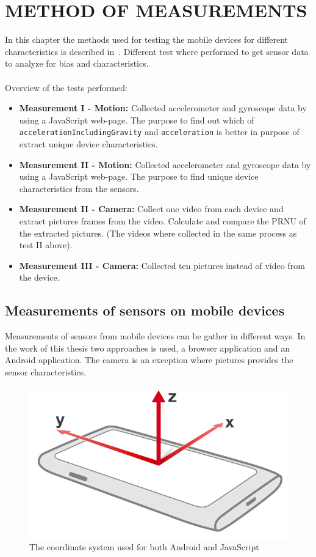 \chapter{METHOD OF MEASUREMENTS}\label{cha:measurements}
In this chapter the methods used for testing the mobile devices for different characteristics is described in~. Different test where performed to get sensor data to analyze for bias and characteristics. \\
\\
Overview of the tests performed:
\begin{itemize}
  \item[] \textbf{Measurement I - Motion:} Collected accelerometer and gyroscope data by using a JavaScript web-page. The purpose to find out which of \texttt{accelerationIncludingGravity} and \texttt{acceleration} is better in purpose of extract unique device characteristics.
  \item[] \textbf{Measurement II - Motion:} Collected accelerometer and gyroscope data by using a JavaScript web-page. The purpose to find unique device characteristics from the sensors. 
  \item[] \textbf{Measurement II - Camera:} Collect one video from each device and extract pictures frames from the video. Calculate and compare the PRNU of the extracted pictures. (The videos where collected in the same process as test II above).
  \item[] \textbf{Measurement III - Camera:} Collected ten pictures instead of video from the device. 
\end{itemize}

\section{Measurements of sensors on mobile devices}\label{sec:charMeasureSensor}
Measurements of sensors from mobile devices can be gather in different ways. In the work of this thesis two approaches is used, a browser application and an Android application. The camera is an exception where pictures provides the sensor characteristics.
\begin{figure}[H]
	\centering
    \includegraphics[scale=0.2]{img/device-axes}
    \caption{The coordinate system used for both Android and JavaScript\cite[]{sensor:W3C}}
  \label{fig:device-axes}
\end{figure}

